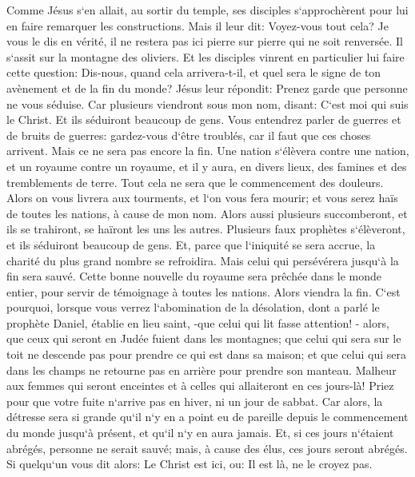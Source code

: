 \verse Comme Jésus s`en allait, au sortir du temple, ses disciples s`approchèrent pour lui en faire remarquer les constructions. 
\verse Mais il leur dit: Voyez-vous tout cela? Je vous le dis en vérité, il ne restera pas ici pierre sur pierre qui ne soit renversée. 
\verse Il s`assit sur la montagne des oliviers. Et les disciples vinrent en particulier lui faire cette question: Dis-nous, quand cela arrivera-t-il, et quel sera le signe de ton avènement et de la fin du monde? 
\verse Jésus leur répondit: Prenez garde que personne ne vous séduise. 
\verse Car plusieurs viendront sous mon nom, disant: C`est moi qui suis le Christ. Et ils séduiront beaucoup de gens. 
\verse Vous entendrez parler de guerres et de bruits de guerres: gardez-vous d`être troublés, car il faut que ces choses arrivent. Mais ce ne sera pas encore la fin. 
\verse Une nation s`élèvera contre une nation, et un royaume contre un royaume, et il y aura, en divers lieux, des famines et des tremblements de terre. 
\verse Tout cela ne sera que le commencement des douleurs. 
\verse Alors on vous livrera aux tourments, et l`on vous fera mourir; et vous serez haïs de toutes les nations, à cause de mon nom. 
\verse Alors aussi plusieurs succomberont, et ils se trahiront, se haïront les uns les autres. 
\verse Plusieurs faux prophètes s`élèveront, et ils séduiront beaucoup de gens. 
\verse Et, parce que l`iniquité se sera accrue, la charité du plus grand nombre se refroidira. 
\verse Mais celui qui persévérera jusqu`à la fin sera sauvé. 
\verse Cette bonne nouvelle du royaume sera prêchée dans le monde entier, pour servir de témoignage à toutes les nations. Alors viendra la fin. 
\verse C`est pourquoi, lorsque vous verrez l`abomination de la désolation, dont a parlé le prophète Daniel, établie en lieu saint, -que celui qui lit fasse attention! - 
\verse alors, que ceux qui seront en Judée fuient dans les montagnes; 
\verse que celui qui sera sur le toit ne descende pas pour prendre ce qui est dans sa maison; 
\verse et que celui qui sera dans les champs ne retourne pas en arrière pour prendre son manteau. 
\verse Malheur aux femmes qui seront enceintes et à celles qui allaiteront en ces jours-là! 
\verse Priez pour que votre fuite n`arrive pas en hiver, ni un jour de sabbat. 
\verse Car alors, la détresse sera si grande qu`il n`y en a point eu de pareille depuis le commencement du monde jusqu`à présent, et qu`il n`y en aura jamais. 
\verse Et, si ces jours n`étaient abrégés, personne ne serait sauvé; mais, à cause des élus, ces jours seront abrégés. 
\verse Si quelqu`un vous dit alors: Le Christ est ici, ou: Il est là, ne le croyez pas. 
